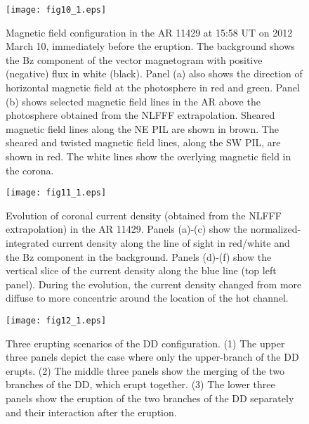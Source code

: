 \documentclass{aastex62}
\begin{document}
\begin{figure}[h]
\centering
\texttt{[image: fig10\_1.eps]}
\caption{Magnetic field configuration in the AR 11429 at 15:58 UT on 2012 March 10, immediately before the eruption. The background shows the Bz component of the vector magnetogram with positive (negative) flux in white (black). Panel (a) also shows the direction of horizontal magnetic field at the photosphere in red  and green. Panel (b) shows selected magnetic field lines in the AR above the photosphere obtained from the NLFFF extrapolation. Sheared magnetic field lines along the NE PIL are shown in brown. The sheared and twisted magnetic field lines, along the SW PIL, are shown in red. The white lines show the overlying magnetic field in the corona.}
\label{fig:mag_config}
\end{figure}


\begin{figure}[tb]
\centering
\texttt{[image: fig11\_1.eps]}
\caption{Evolution of coronal current density (obtained from the NLFFF extrapolation) in the AR 11429. Panels (a)-(c) show the normalized-integrated current density along the line of sight in red/white and the Bz component in the background. Panels (d)-(f) show the vertical slice of the current density along the blue line (top left panel). During the evolution, the current density changed from more diffuse to more concentric around the location of the hot channel.}
\label{fig:current}
\end{figure}

\begin{figure}[h]
\centering
\texttt{[image: fig12\_1.eps]}
\caption{Three erupting scenarios of the DD configuration. (1) The upper three panels depict the case where only the upper-branch of the DD erupts. (2) The middle three panels show the merging of the two branches of the DD, which erupt together. (3) The lower three panels show the eruption of the two branches of the DD separately and their interaction after the eruption.}
\label{fig:cartoon}
\end{figure}
\end{document}
